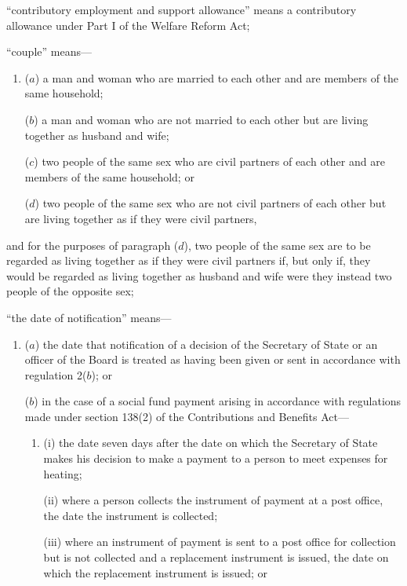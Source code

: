 \documentclass[12pt,a4paper]{article}
\begin{document}
\begin{enumerate}
“contributory employment and support allowance” means a contributory allowance under Part I of the Welfare Reform Act;

“couple” means—
\begin{enumerate}\item[]
($a$) 
a man and woman who are married to each other and are members of the same household;

($b$) 
a man and woman who are not married to each other but are living together as husband and wife;

($c$) 
two people of the same sex who are civil partners of each other and are members of the same household; or

($d$) 
two people of the same sex who are not civil partners of each other but are living together as if they were civil partners,
\end{enumerate}
and for the purposes of paragraph ($d$), two people of the same sex are to be regarded as living together as if they were civil partners if, but only if, they would be regarded as living together as husband and wife were they instead two people of the opposite sex; 

“the date of notification” means—
\begin{enumerate}\item[]
($a$) the date that notification of a decision of the Secretary of State 
or an officer of the Board  %
is treated as having been given or sent in accordance with regulation 2($b$); or

($b$) in the case of a social fund payment arising in accordance with regulations made under section 138(2) of the Contributions and Benefits Act—
\begin{enumerate}\item[]
(i) the date seven days after the date on which the Secretary of State makes his decision to make a payment to a person to meet expenses for heating;

(ii) where a person collects the instrument of payment at a post office, the date the instrument is collected;

(iii) where an instrument of payment is sent to a post office for collection but is not collected and a replacement instrument is issued, the date on which the replacement instrument is issued; or


\end{enumerate}
\end{enumerate}
\end{enumerate}
\end{document}
